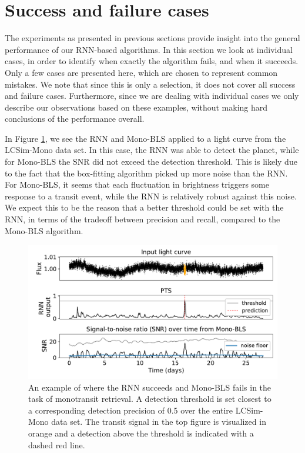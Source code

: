 \section{Success and failure cases}
\label{sec:cases}

The experiments as presented in previous sections provide insight into the general performance of our RNN-\nobreak{}based algorithms. In this section we look at individual cases, in order to identify when exactly the algorithm fails, and when it succeeds. Only a few cases are presented here, which are chosen to represent common mistakes. We note that since this is only a selection, it does not cover all success and failure cases. Furthermore, since we are dealing with individual cases we only describe our observations based on these examples, without making hard conclusions of the performance overall.

In Figure \ref{fig:sf_mono_rnn_not_bls}, we see the RNN and Mono-BLS applied to a light curve from the LCSim-Mono data set. In this case, the RNN was able to detect the planet, while for Mono-BLS the SNR did not exceed the detection threshold. This is likely due to the fact that the box-fitting algorithm picked up more noise than the RNN. For Mono-BLS, it seems that each fluctuation in brightness triggers some response to a transit event, while the RNN is relatively robust against this noise. We expect this to be the reason that a better threshold could be set with the RNN, in terms of the tradeoff between precision and recall, compared to the Mono-BLS algorithm.

\begin{figure}
    \centering
    \includegraphics[width=0.65\linewidth]{Experiments/Figures/Cases/sf_mono_rnn_not_bls_3.pdf}
    \caption{An example of where the RNN succeeds and Mono-BLS fails in the task of monotransit retrieval. A detection threshold is set closest to a corresponding detection precision of 0.5 over the entire LCSim-Mono data set. The transit signal in the top figure is visualized in orange and a detection above the threshold is indicated with a dashed red line.}
    \label{fig:sf_mono_rnn_not_bls}
\end{figure}

